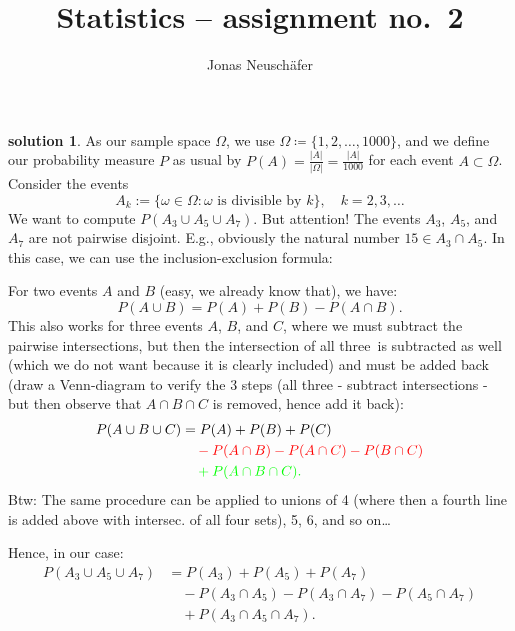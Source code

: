 \documentclass[a4paper]{article}
\title{\vspace{-2.5\baselineskip}Statistics -- assignment no.~2}
\author{Jonas Neuschäfer}
\theoremstyle{definition}
\newtheorem{solution}{solution}
\begin{document}
\maketitle
\addtocounter{solution}{9}
\begin{solution}
As our sample space $\Omega$, we use $\Omega \coloneqq \{1, 2, \ldots, 1000\}$, and we define our probability measure $P$ as usual by $P(A) = \frac{|A|}{|\Omega|} = \frac{|A|}{1000}$ for each event $A \subset \Omega$. Consider the events
\begin{equation*}
A_k := \{\omega \in \Omega : \omega \text{ is divisible by } k\}, \quad k = 2, 3, \ldots
\end{equation*}
We want to compute $P(A_3 \cup A_5 \cup A_7)$. But attention! The events $A_3$, $A_5$, and $A_7$ are not pairwise disjoint. E.g., obviously the natural number $15 \in A_3 \cap A_5$. In this case, we can use the inclusion-exclusion formula:
\begin{tcolorbox}[colback=blue!5!white, colframe=blue!75!black, title=Inclusion-Exclusion Principle]
For two events $A$ and $B$ (easy, we already know that), we have:
\begin{equation*}
P(A \cup B) = P(A) + P(B) - P(A \cap B).
\end{equation*}
This also works for three events $A$, $B$, and $C$, where we must \color{red}subtract the pairwise intersections\color{black}, but then the \color{green}intersection of all three\color{black}~is subtracted as well (which we do not want because it is clearly included) and must be \color{green} added back\color{black} (draw a Venn-diagram to verify the 3 steps (all three - subtract intersections - but then observe that $A \cap B \cap C$ is removed, hence add it back):
\begin{align}
P(A \cup B \cup C) &= P(A) + P(B) + P(C) \\
&\quad \color{red}- P(A \cap B) - P(A \cap C) - P(B \cap C) \\
&\quad \color{green}+ P(A \cap B \cap C).
\end{align}
Btw: The same procedure can be applied to unions of 4 (where then a fourth line is added above with intersec. of all four sets), 5, 6, and so on\dots
\end{tcolorbox}
Hence, in our case:
\begin{align*}
P(A_3 \cup A_5 \cup A_7) &= P(A_3) + P(A_5) + P(A_7) \\
&\quad - P(A_3 \cap A_5) - P(A_3 \cap A_7) - P(A_5 \cap A_7) \\
&\quad + P(A_3 \cap A_5 \cap A_7).

\end{align*}
\end{solution}
\end{document}
